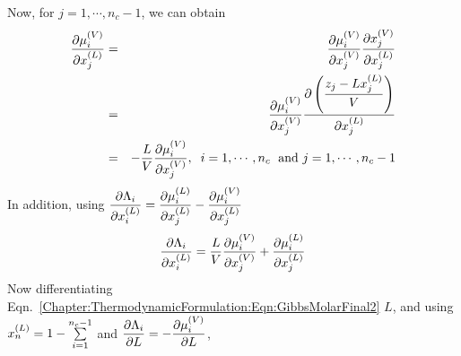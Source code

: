 \medskip
Now, for $j=1, \cdots, n_{c}-1$, we can obtain
\begin{eqnarray}
   \frc{\partial\mfr[\mu]{i}{V}}{\partial\mfr[x]{j}{L}} &=& \frc{\partial\mfr[\mu]{i}{V}}{\partial\mfr[x]{j}{V}} \frc{\partial\mfr[x]{j}{V}}{\partial\mfr[x]{j}{L}} \nonumber \\
                                                        &=& \frc{\partial\mfr[\mu]{i}{V}}{\partial\mfr[x]{j}{V}} \frc{\partial\left(\frc{z_{j}-L\mfr[x]{j}{L}}{V}\right)}{\partial\mfr[x]{j}{L}} \nonumber \\
                                                        &=& -\frc{L}{V}\frc{\partial\mfr[\mu]{i}{V}}{\partial\mfr[x]{j}{V}}, \hspace{.2cm} i=1, \cdots, n_{c} \hspace{.1cm} \text{ and } j=1, \cdots, n_{c}-1 \label{Chapter:ThermodynamicFormulation:Eqn:PartialMuWRTXL}
\end{eqnarray}
In addition, using $\frc{\partial\Lambda_{i}}{\partial\mfr[x]{i}{L}} = \frc{\partial\mfr[\mu]{i}{L}}{\partial\mfr[x]{j}{L}} - \frc{\partial\mfr[\mu]{i}{V}}{\partial\mfr[x]{j}{L}}$
\begin{equation}
   \frc{\partial\Lambda_{i}}{\partial\mfr[x]{i}{L}} = \frc{L}{V}\frc{\partial\mfr[\mu]{i}{V}}{\partial\mfr[x]{j}{V}} + \frc{\partial\mfr[\mu]{i}{L}}{\partial\mfr[x]{j}{L}}\label{Chapter:ThermodynamicFormulation:Eqn:PartialLambdaWRTXL}
\end{equation}
Now differentiating Eqn.~\ref{Chapter:ThermodynamicFormulation:Eqn:GibbsMolarFinal2} \wrt $L$, and using $\mfr[x]{n}{L}=1-\summation_{i=1}^{n_{c}-1}$ and $\frc{\partial\Lambda_{i}}{\partial L} = - \frc{\partial\mfr[\mu]{i}{V}}{\partial L}$,

